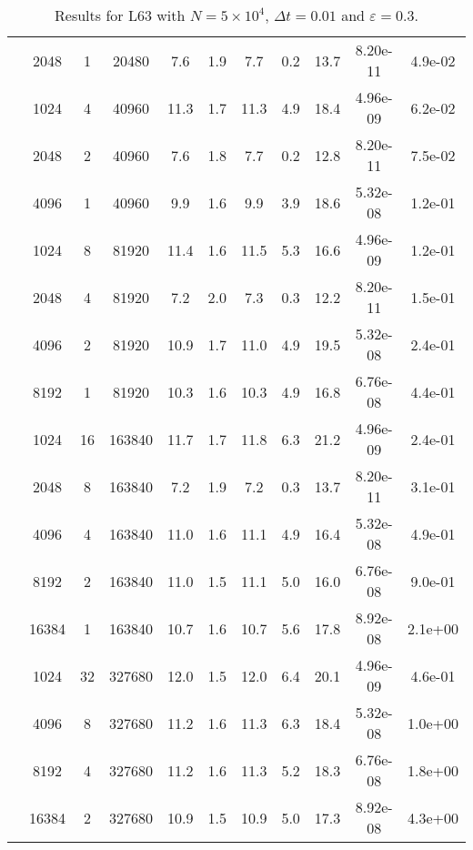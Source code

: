 \begin{table}[!htp]
\begin{tabular}{|c|c|c|c|c|c|c|c|c|c|c|}
 & 2048 & 1 & 20480 & 7.6 & 1.9 & 7.7 & 0.2 & 13.7 & 8.20e-11 & 4.9e-02\\ \cline{2-11}
 & 1024 & 4 & 40960 & 11.3 & 1.7 & 11.3 & 4.9 & 18.4 & 4.96e-09 & 6.2e-02\\ \cline{2-11}
 & 2048 & 2 & 40960 & 7.6 & 1.8 & 7.7 & 0.2 & 12.8 & 8.20e-11 & 7.5e-02\\ \cline{2-11}
 & 4096 & 1 & 40960 & 9.9 & 1.6 & 9.9 & 3.9 & 18.6 & 5.32e-08 & 1.2e-01\\ \cline{2-11}
 & 1024 & 8 & 81920 & 11.4 & 1.6 & 11.5 & 5.3 & 16.6 & 4.96e-09 & 1.2e-01\\ \cline{2-11}
 & 2048 & 4 & 81920 & 7.2 & 2.0 & 7.3 & 0.3 & 12.2 & 8.20e-11 & 1.5e-01\\ \cline{2-11}
 & 4096 & 2 & 81920 & 10.9 & 1.7 & 11.0 & 4.9 & 19.5 & 5.32e-08 & 2.4e-01\\ \cline{2-11}
 & 8192 & 1 & 81920 & 10.3 & 1.6 & 10.3 & 4.9 & 16.8 & 6.76e-08 & 4.4e-01\\ \cline{2-11}
 & 1024 & 16 & 163840 & 11.7 & 1.7 & 11.8 & 6.3 & 21.2 & 4.96e-09 & 2.4e-01\\ \cline{2-11}
 & 2048 & 8 & 163840 & 7.2 & 1.9 & 7.2 & 0.3 & 13.7 & 8.20e-11 & 3.1e-01\\ \cline{2-11}
 & 4096 & 4 & 163840 & 11.0 & 1.6 & 11.1 & 4.9 & 16.4 & 5.32e-08 & 4.9e-01\\ \cline{2-11}
 & 8192 & 2 & 163840 & 11.0 & 1.5 & 11.1 & 5.0 & 16.0 & 6.76e-08 & 9.0e-01\\ \cline{2-11}
 & 16384 & 1 & 163840 & 10.7 & 1.6 & 10.7 & 5.6 & 17.8 & 8.92e-08 & 2.1e+00\\ \cline{2-11}
 & \cellcolor{pink}1024 & \cellcolor{pink}32 & \cellcolor{pink}327680 & \cellcolor{pink}12.0 & \cellcolor{pink}1.5 & \cellcolor{pink}12.0 & \cellcolor{pink}6.4 & \cellcolor{pink}20.1 & \cellcolor{pink}4.96e-09 & \cellcolor{pink}4.6e-01\\ \cline{2-11}
 & 4096 & 8 & 327680 & 11.2 & 1.6 & 11.3 & 6.3 & 18.4 & 5.32e-08 & 1.0e+00\\ \cline{2-11}
 & 8192 & 4 & 327680 & 11.2 & 1.6 & 11.3 & 5.2 & 18.3 & 6.76e-08 & 1.8e+00\\ \cline{2-11}
 & 16384 & 2 & 327680 & 10.9 & 1.5 & 10.9 & 5.0 & 17.3 & 8.92e-08 & 4.3e+00\\ \cline{2-11}
\cline{1-2}
\end{tabular}
    \caption{Results for L63 with $N=5\times10^4$, $\Delta t=0.01$ and $\varepsilon=0.3$.}
    \label{tab:L63_1_s}
\end{table}

